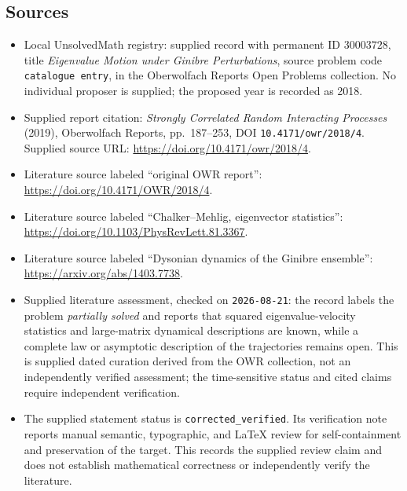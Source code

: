\documentclass[11pt]{article}
\begin{document}
\subsection{Sources}
\begin{itemize}
\item Local UnsolvedMath registry: supplied record with permanent ID \(30003728\), title \emph{Eigenvalue Motion under Ginibre Perturbations}, source problem code \texttt{catalogue entry}, in the Oberwolfach Reports Open Problems collection. No individual proposer is supplied; the proposed year is recorded as 2018.
\item Supplied report citation: \emph{Strongly Correlated Random Interacting Processes} (2019), Oberwolfach Reports, pp.~187--253, DOI \texttt{10.4171/owr/2018/4}. Supplied source URL: \url{https://doi.org/10.4171/owr/2018/4}.
\item Literature source labeled ``original OWR report'': \url{https://doi.org/10.4171/OWR/2018/4}.
\item Literature source labeled ``Chalker--Mehlig, eigenvector statistics'': \url{https://doi.org/10.1103/PhysRevLett.81.3367}.
\item Literature source labeled ``Dysonian dynamics of the Ginibre ensemble'': \url{https://arxiv.org/abs/1403.7738}.
\item Supplied literature assessment, checked on \texttt{2026-08-21}: the record labels the problem \emph{partially solved} and reports that squared eigenvalue-velocity statistics and large-matrix dynamical descriptions are known, while a complete law or asymptotic description of the trajectories remains open. This is supplied dated curation derived from the OWR collection, not an independently verified assessment; the time-sensitive status and cited claims require independent verification.
\item The supplied statement status is \texttt{corrected\_verified}. Its verification note reports manual semantic, typographic, and LaTeX review for self-containment and preservation of the target. This records the supplied review claim and does not establish mathematical correctness or independently verify the literature.
\end{itemize}
\end{document}
